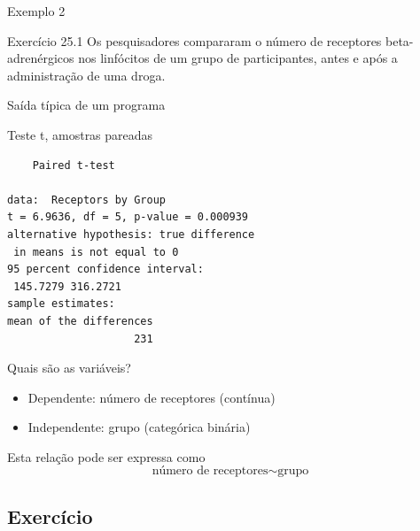 \documentclass{beamer}
\begin{document}
\begin{frame}{\scriptsize Exemplo 2}
  \begin{exampleblock}{Exercício 25.1}
    \footnotesize
    Os pesquisadores compararam o número de receptores beta-adrenérgicos nos linfócitos de um grupo de participantes, antes e após a administração de uma droga.

  \end{exampleblock}
\end{frame}

\begin{frame}[fragile]{\scriptsize Saída típica de um programa}
  \begin{exampleblock}{Teste t, amostras pareadas}
    \scriptsize
\begin{verbatim}
	Paired t-test

data:  Receptors by Group
t = 6.9636, df = 5, p-value = 0.000939
alternative hypothesis: true difference
 in means is not equal to 0
95 percent confidence interval:
 145.7279 316.2721
sample estimates:
mean of the differences 
                    231
\end{verbatim}
  \end{exampleblock}
\end{frame}

\begin{frame}{\scriptsize Quais são as variáveis?}
  \begin{itemize}
    \footnotesize
  \item Dependente: número de receptores (contínua)
  \item Independente: grupo (categórica binária)
  \end{itemize}
  \vfill
  \begin{block}{Esta relação pode ser expressa como}
    \begin{displaymath}
      \text{número de receptores} \sim \text{grupo}
    \end{displaymath}
  \end{block}
\end{frame}

\subsection{Exercício}
\end{document}
